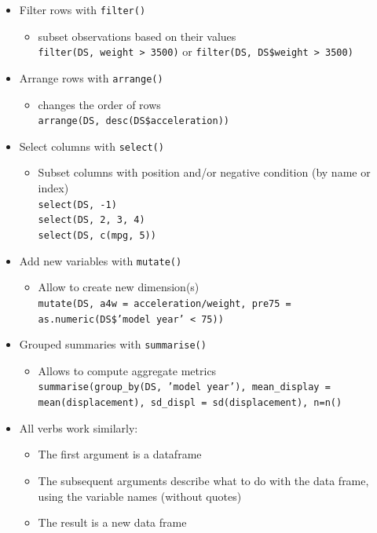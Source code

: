 \documentclass[a4paper]{article}
\begin{document}
			\begin{itemize}
				\item Filter rows with \texttt{filter()}
					\begin{itemize}
						\item subset observations based on their values \\
						\texttt{filter(DS, weight > 3500)} or \texttt{filter(DS, DS\$weight > 3500)}
					\end{itemize}
				\item Arrange rows with \texttt{arrange()}
					\begin{itemize}
						\item changes the order of rows \\
						\texttt{arrange(DS, desc(DS\$acceleration))}
					\end{itemize}
				\item Select columns with \texttt{select()}
					\begin{itemize}
						\item Subset columns with position and/or negative condition (by name or index) \\
						\texttt{select(DS, -1)} \\
						\texttt{select(DS, 2, 3, 4)} \\
						\texttt{select(DS, c(mpg, 5))}
					\end{itemize}
				\item Add new variables with \texttt{mutate()} 
					\begin{itemize}
						\item Allow to create new dimension(s) \\
						\texttt{mutate(DS, a4w = acceleration/weight, pre75 = as.numeric(DS\$'model year' < 75))}
					\end{itemize}
				\item Grouped summaries with \texttt{summarise()}
					\begin{itemize}
						\item Allows to compute aggregate metrics \\
						\texttt{summarise(group\_by(DS, 'model year'), mean\_display = mean(displacement), sd\_displ = sd(displacement), n=n()}
					\end{itemize}
			\end{itemize}
			\vspace{1em}
			\begin{itemize}
				\item All verbs work similarly:
					\begin{itemize}
						\item The first argument is a dataframe
						\item The subsequent arguments describe what to do with the data frame, using the variable names (without quotes)
						\item The result is a new data frame
					\end{itemize}
			\end{itemize}
		
\end{document}
